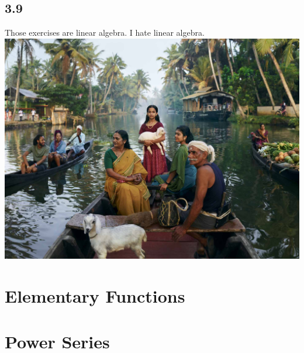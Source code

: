 \documentclass[12pt,oneside]{book}
\begin{document}
\section{3.9}
Those exercises are linear algebra. I hate linear algebra. \\
\newpage
\includegraphics[width=1.15\textwidth]{graphics/2-2.jpg}


\chapter{Elementary Functions}



\chapter{Power Series}
\end{document}
